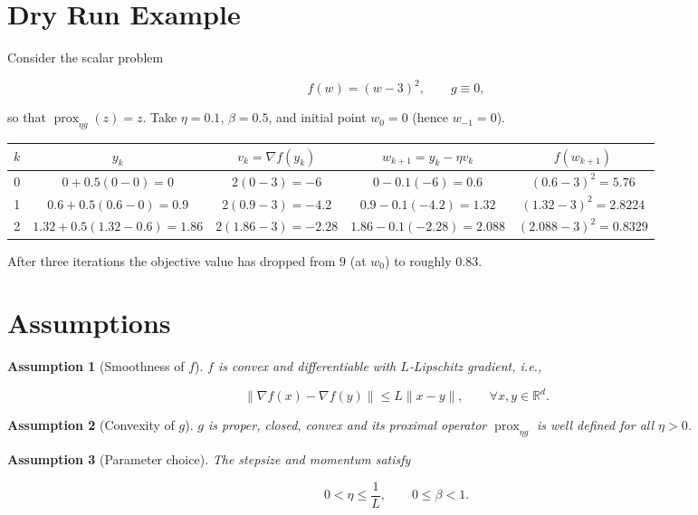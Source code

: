 \documentclass{article}
\newtheorem{assumption}{Assumption}
\newcommand{\prox}{\operatorname{prox}}
\newcommand{\grad}{\nabla}
\begin{document}
\section*{Dry Run Example}
Consider the scalar problem  

\[
f(w) = (w-3)^2,\qquad g\equiv 0,
\]

so that $\prox_{\eta g}(z)=z$.  
Take $\eta=0.1$, $\beta=0.5$, and initial point $w_0=0$ (hence $w_{-1}=0$).

\begin{center}
\begin{tabular}{c|c|c|c|c}
$k$ & $y_k$ & $v_k=\grad f(y_k)$ & $w_{k+1}=y_k-\eta v_k$ & $f(w_{k+1})$\\ \hline
0 & $0+0.5(0-0)=0$ & $2(0-3)=-6$ & $0-0.1(-6)=0.6$ & $(0.6-3)^2=5.76$\\
1 & $0.6+0.5(0.6-0)=0.9$ & $2(0.9-3)=-4.2$ & $0.9-0.1(-4.2)=1.32$ & $(1.32-3)^2=2.8224$\\
2 & $1.32+0.5(1.32-0.6)=1.86$ & $2(1.86-3)=-2.28$ & $1.86-0.1(-2.28)=2.088$ & $(2.088-3)^2=0.8329$\\
\end{tabular}
\end{center}

After three iterations the objective value has dropped from $9$ (at $w_0$) to roughly $0.83$.

\section*{Assumptions}
\begin{assumption}[Smoothness of $f$]\label{ass:smooth}
$f$ is convex and differentiable with $L$‑Lipschitz gradient, i.e.,  

\[
\|\grad f(x)-\grad f(y)\|\le L\|x-y\|,\qquad\forall x,y\in\mathbb{R}^d .
\tag{A1}
\]
\end{assumption}

\begin{assumption}[Convexity of $g$]\label{ass:convex}
$g$ is proper, closed, convex and its proximal operator $\prox_{\eta g}$ is well defined for all $\eta>0$.
\end{assumption}

\begin{assumption}[Parameter choice]\label{ass:param}
The stepsize and momentum satisfy  

\[
0<\eta\le\frac{1}{L},\qquad 0\le\beta<1 .
\tag{A3}
\]
\end{assumption}
\end{document}
